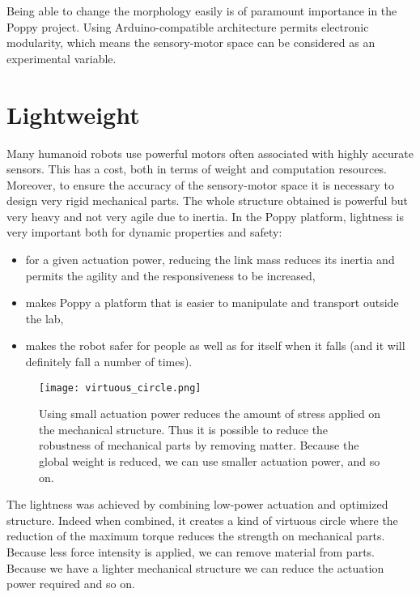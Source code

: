 Being able to change the morphology easily is of paramount importance in the Poppy project. Using Arduino-compatible architecture permits electronic modularity, which means the sensory-motor space can be considered as an experimental variable.


\section{Lightweight} %
\label{sec:lightweight-robot}

Many humanoid robots use powerful motors often associated with highly accurate sensors. This has a cost, both in terms of weight and computation resources. Moreover, to ensure the accuracy of the sensory-motor space it is necessary to design very rigid mechanical parts. The whole structure obtained is powerful but very heavy and not very agile due to inertia.
In the Poppy platform, lightness is very important both for dynamic properties and safety:
\begin{itemize}
    \item for a given actuation power, reducing the link mass reduces its inertia and permits the agility and the responsiveness to be increased,
    \item makes Poppy a platform that is easier to manipulate and transport outside the lab,
    \item makes the robot safer for people as well as for itself when it falls (and it will definitely fall a number of times).
\end{itemize}

\begin{figure}[!t]
    \centering
        \texttt{[image: virtuous\_circle.png]}
    \caption{Using small actuation power reduces the amount of stress applied on the mechanical structure. Thus it is possible to reduce the robustness of mechanical parts by removing matter. Because the global weight is reduced, we can use smaller actuation power, and so on.}
    \label{fig:virtuous_circle}
\end{figure}

The lightness was achieved by combining low-power actuation and optimized structure. Indeed when combined, it creates a kind of virtuous circle where the reduction of the maximum torque reduces the strength on mechanical parts. Because less force intensity is applied, we can remove material from parts. Because we have a lighter mechanical structure we can reduce the actuation power required and so on.


